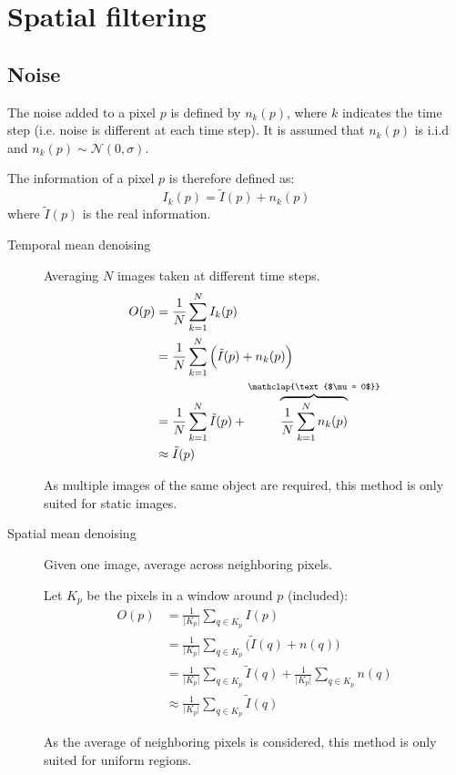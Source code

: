 \chapter{Spatial filtering}


\section{Noise}

The noise added to a pixel $p$ is defined by $n_k(p)$, 
where $k$ indicates the time step (i.e. noise is different at each time step).
It is assumed that $n_k(p)$ is i.i.d and $n_k(p) \sim \mathcal{N}(0, \sigma)$.

The information of a pixel $p$ is therefore defined as:
\[ I_k(p) = \tilde{I}(p) + n_k(p) \]
where $\tilde{I}(p)$ is the real information.

\begin{description}
    \item[Temporal mean denoising] 
        Averaging $N$ images taken at different time steps.
        \[ 
            \begin{split}
                O(p) &= \frac{1}{N} \sum_{k=1}^{N} I_k(p) \\
                    &= \frac{1}{N} \sum_{k=1}^{N} \Big( \tilde{I}(p) + n_k(p) \Big) \\
                    &= \frac{1}{N} \sum_{k=1}^{N} \tilde{I}(p) + \overbrace{\frac{1}{N} \sum_{k=1}^{N} n_k(p)}^{\mathclap{\text{$\mu = 0$}}} \\
                    &\approx \tilde{I}(p)
            \end{split}
        \]

        \begin{remark}
            As multiple images of the same object are required, this method is only suited for static images.
        \end{remark}

    \item[Spatial mean denoising] 
        Given one image, average across neighboring pixels.

        Let $K_p$ be the pixels in a window around $p$ (included):
        \[ 
            \begin{split}
                O(p) &= \frac{1}{\vert K_p \vert} \sum_{q \in K_p} I(p) \\
                    &= \frac{1}{\vert K_p \vert} \sum_{q \in K_p} \Big( \tilde{I}(q) + n(q) \Big) \\
                    &= \frac{1}{\vert K_p \vert} \sum_{q \in K_p} \tilde{I}(q) + \frac{1}{\vert K_p \vert} \sum_{q \in K_p} n(q) \\
                    &\approx \frac{1}{\vert K_p \vert} \sum_{q \in K_p} \tilde{I}(q)
            \end{split}
        \]

        \begin{remark}
            As the average of neighboring pixels is considered, this method is only suited for uniform regions.
        \end{remark}
\end{description}